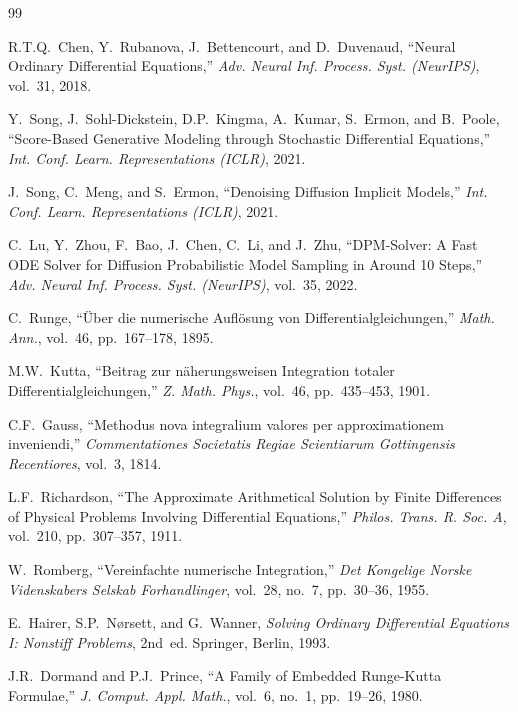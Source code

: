 \documentclass[conference]{IEEEtran}
\begin{document}
\begin{thebibliography}{99}

R.T.Q.~Chen, Y.~Rubanova, J.~Bettencourt, and D.~Duvenaud,
``Neural Ordinary Differential Equations,''
\emph{Adv. Neural Inf. Process. Syst. (NeurIPS)}, vol.~31, 2018.

Y.~Song, J.~Sohl-Dickstein, D.P.~Kingma, A.~Kumar, S.~Ermon,
and B.~Poole,
``Score-Based Generative Modeling through Stochastic Differential
Equations,''
\emph{Int. Conf. Learn. Representations (ICLR)}, 2021.

J.~Song, C.~Meng, and S.~Ermon,
``Denoising Diffusion Implicit Models,''
\emph{Int. Conf. Learn. Representations (ICLR)}, 2021.

C.~Lu, Y.~Zhou, F.~Bao, J.~Chen, C.~Li, and J.~Zhu,
``DPM-Solver: A Fast ODE Solver for Diffusion Probabilistic Model
Sampling in Around 10 Steps,''
\emph{Adv. Neural Inf. Process. Syst. (NeurIPS)}, vol.~35, 2022.

C.~Runge,
``\"{U}ber die numerische Aufl\"{o}sung von Differentialgleichungen,''
\emph{Math. Ann.}, vol.~46, pp.~167--178, 1895.

M.W.~Kutta,
``Beitrag zur n\"{a}herungsweisen Integration totaler
Differentialgleichungen,''
\emph{Z. Math. Phys.}, vol.~46, pp.~435--453, 1901.

C.F.~Gauss,
``Methodus nova integralium valores per approximationem inveniendi,''
\emph{Commentationes Societatis Regiae Scientiarum Gottingensis
Recentiores}, vol.~3, 1814.

L.F.~Richardson,
``The Approximate Arithmetical Solution by Finite Differences of
Physical Problems Involving Differential Equations,''
\emph{Philos. Trans. R. Soc. A}, vol.~210, pp.~307--357, 1911.

W.~Romberg,
``Vereinfachte numerische Integration,''
\emph{Det Kongelige Norske Videnskabers Selskab Forhandlinger},
vol.~28, no.~7, pp.~30--36, 1955.

E.~Hairer, S.P.~N{\o}rsett, and G.~Wanner,
\emph{Solving Ordinary Differential Equations I: Nonstiff Problems},
2nd~ed. Springer, Berlin, 1993.

J.R.~Dormand and P.J.~Prince,
``A Family of Embedded Runge-Kutta Formulae,''
\emph{J. Comput. Appl. Math.}, vol.~6, no.~1, pp.~19--26, 1980.

\end{thebibliography}
\end{document}

